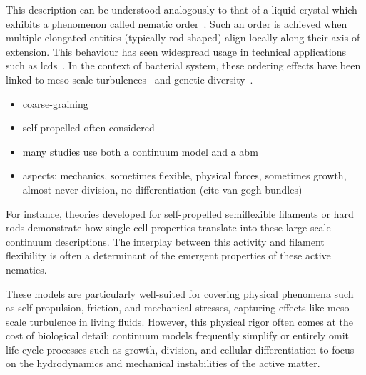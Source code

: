 This description can be understood analogously to that of a liquid crystal which exhibits
a phenomenon called nematic order~\cite{Volfson2008}.
Such an order is achieved when multiple elongated entities (typically rod-shaped) align
locally along their axis of extension.
This behaviour has seen widespread usage in technical applications such as \acp{lcd}~\cite{Koo2006}.
In the context of bacterial system, these ordering effects have been linked to meso-scale
turbulences~\cite{Wensink2012} and genetic diversity~\cite{Schwarzendahl2022}.

\begin{itemize}
    \item coarse-graining \cite{Wensink2012,Moreau2018,You2018,Boyer2011,Moreau2018}
    \item self-propelled often considered \cite{Saintillan2013,Volfson2008,Doi1988-ad}
    \item many studies use both a continuum model and a \ac{abm}
    \item aspects: mechanics, sometimes flexible, physical forces, sometimes growth,
        almost never division, no differentiation (cite van gogh bundles)
\end{itemize}

For instance, theories developed for self-propelled semiflexible filaments or hard rods
demonstrate how single-cell properties translate into these large-scale continuum descriptions.
The interplay between this activity and filament flexibility is often a determinant of
the emergent properties of these active nematics.

These models are particularly well-suited for covering physical phenomena such as
self-propulsion, friction, and mechanical stresses, capturing effects like meso-scale
turbulence in living fluids.
However, this physical rigor often comes at the cost of biological detail; continuum
models frequently simplify or entirely omit life-cycle processes such as growth,
division, and cellular differentiation to focus on the hydrodynamics and mechanical
instabilities of the active matter.

